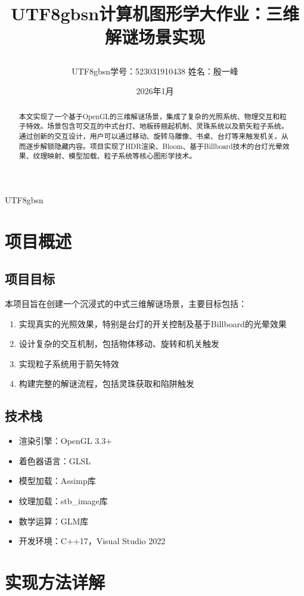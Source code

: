 \documentclass{article}
\title{\begin{CJK}{UTF8}{gbsn}计算机图形学大作业：三维解谜场景实现\end{CJK}}
\author{\begin{CJK}{UTF8}{gbsn}学号：523031910438 \quad 姓名：殷一峰\end{CJK}}
\date{2026年1月}
\begin{document}
\begin{CJK}{UTF8}{gbsn}

\maketitle

\begin{abstract}
本文实现了一个基于OpenGL的三维解谜场景，集成了复杂的光照系统、物理交互和粒子特效。场景包含可交互的中式台灯、地板砖翘起机制、灵珠系统以及箭矢粒子系统。通过创新的交互设计，用户可以通过移动、旋转马雕像、书桌、台灯等来触发机关，从而逐步解锁隐藏内容。项目实现了HDR渲染、Bloom、基于Billboard技术的台灯光晕效果、纹理映射、模型加载、粒子系统等核心图形学技术。
\end{abstract}

\section{项目概述}

\subsection{项目目标}
本项目旨在创建一个沉浸式的中式三维解谜场景，主要目标包括：
\begin{enumerate}
    \item 实现真实的光照效果，特别是台灯的开关控制及基于Billboard的光晕效果
    \item 设计复杂的交互机制，包括物体移动、旋转和机关触发
    \item 实现粒子系统用于箭矢特效
    \item 构建完整的解谜流程，包括灵珠获取和陷阱触发
\end{enumerate}

\subsection{技术栈}
\begin{itemize}
    \item 渲染引擎：OpenGL 3.3+
    \item 着色器语言：GLSL
    \item 模型加载：Assimp库
    \item 纹理加载：stb\_image库
    \item 数学运算：GLM库
    \item 开发环境：C++17，Visual Studio 2022
\end{itemize}

\section{实现方法详解}


\end{CJK}
\end{document}
